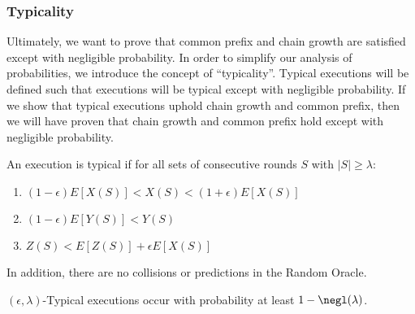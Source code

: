 \subsubsection{Typicality}

Ultimately, we want to prove that common prefix and chain growth are satisfied except with negligible probability. In order to simplify our analysis of probabilities, we introduce the concept of ``typicality''. Typical executions will be defined such that executions will be typical except with negligible probability. If we show that typical executions uphold chain growth and common prefix, then we will have proven that chain growth and common prefix hold except with negligible probability.

\begin{definition}
An execution is typical if for all sets of consecutive rounds $S$ with $|S| \geq \lambda$:
\begin{enumerate}
    \item $(1-\epsilon) E[X(S)] < X(S) < (1+\epsilon) E[X(S)]$
    \item $(1-\epsilon) E[Y(S)] < Y(S) $
    \item $ Z(S) < E[Z(S)] + \epsilon E[X(S)] $
\end{enumerate}
In addition, there are no collisions or predictions in the Random Oracle.
\end{definition}

\begin{theorem}
$(\epsilon,\lambda)$-Typical executions occur with probability at least $1-\negl(\lambda)$.
\end{theorem}

